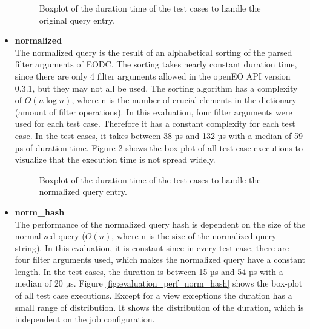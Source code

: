 \documentclass[draft,final]{vutinfth} %
\begin{document}
\begin{itemize}
\begin{figure}[!h]
		\centering
		\caption{Boxplot of the duration time of the test cases to handle the original query entry.}
		\label{fig:evaluation_perf_original}
	\end{figure}
	\item \textbf{normalized} \\
	The normalized query is the result of an alphabetical sorting of the parsed filter arguments of EODC. The sorting takes nearly constant duration time, since there are only 4 filter arguments allowed in the openEO API version 0.3.1, but they may not all be used. The sorting algorithm has a complexity of $O(n\log{}n)$, where n is the number of crucial elements in the dictionary (amount of filter operations). In this evaluation, four filter arguments were used for each test case. Therefore it has a constant complexity for each test case. In the test cases, it takes between 38 µs and 132 µs with a median of 59 µs of duration time. Figure \ref{fig:evaluation_perf_normalized} shows the box-plot of all test case executions to visualize that the execution time is not spread widely.  
	\begin{figure}[!h]
		\centering
		\caption{Boxplot of the duration time of the test cases to handle the normalized query entry.}
		\label{fig:evaluation_perf_normalized}
	\end{figure}
	\item \textbf{norm\_hash} \\
	The performance of the normalized query hash is dependent on the size of the normalized query ($O(n)$, where n is the size of the normalized query string). In this evaluation, it is constant since in every test case, there are four filter arguments used, which makes the normalized query have a constant length. In the test cases, the duration is between 15 µs and 54 µs with a median of 20 µs. Figure \ref{fig:evaluation_perf_norm_hash} shows the box-plot of all test case executions. Except for a view exceptions the duration has a small range of distribution. It shows the distribution of the duration, which is independent on the job configuration. 

\end{itemize}
\end{document}
